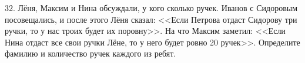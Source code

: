 32. Лёня, Максим и Нина обсуждали, у кого сколько ручек. Иванов с Сидоровым посовещались, и после этого Лёня сказал: <<Если Петрова отдаст Сидорову три ручки, то у нас троих будет их поровну>>. На что Максим заметил: <<Если Нина отдаст все свои ручки Лёне, то у него будет ровно 20 ручек>>. Определите фамилию и количество ручек каждого из ребят.\\
